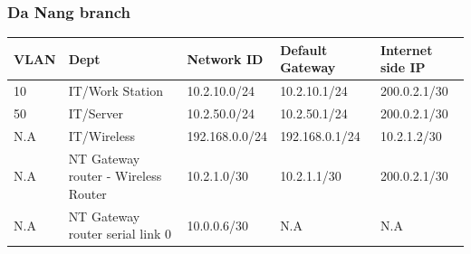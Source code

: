 \subsubsection{Da Nang branch}
\begin{center}
  \begin{tabular}{|p{}|p{}|p{}|p{}|p{}|}
    \hline
    VLAN & Dept                                & Network ID & Default Gateway & Internet side IP \\
    \hline
    10   & IT/Work Station
         & 10.2.10.0/24
         & 10.2.10.1/24
         & 200.0.2.1/30
    \\
    \hline
    50   & IT/Server
         & 10.2.50.0/24
         & 10.2.50.1/24
         & 200.0.2.1/30
    \\
    \hline
    N.A  & IT/Wireless
         & 192.168.0.0/24
         & 192.168.0.1/24
         & 10.2.1.2/30
    \\
    \hline
    N.A  & NT Gateway router - Wireless Router
         & 10.2.1.0/30
         & 10.2.1.1/30
         & 200.0.2.1/30
    \\
    \hline
    N.A  & NT Gateway router serial link 0
         & 10.0.0.6/30
         & N.A
         & N.A
    \\
    \hline
  \end{tabular}
\end{center}
